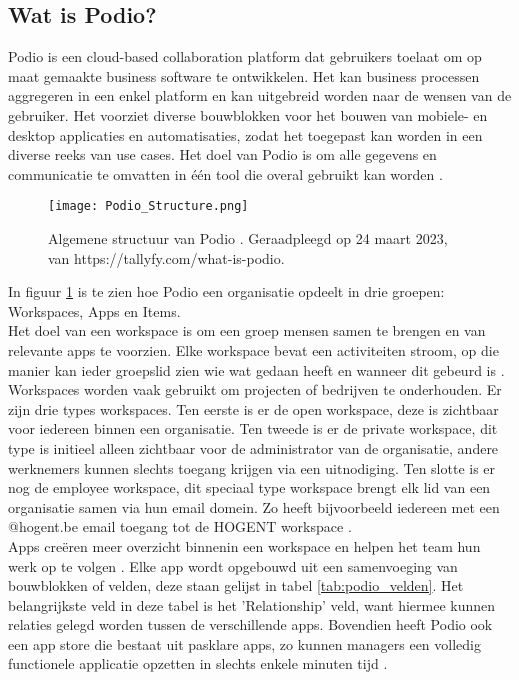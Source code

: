 \subsection{Wat is Podio?}
\label{subsec:wat_is_podio}

Podio is een cloud-based collaboration platform dat gebruikers toelaat om op maat gemaakte business software te ontwikkelen. Het kan business processen aggregeren in een enkel platform en kan uitgebreid worden naar de wensen van de gebruiker. Het voorziet diverse bouwblokken voor het bouwen van mobiele- en desktop applicaties en automatisaties, zodat het toegepast kan worden in een diverse reeks van use cases. Het doel van Podio is om alle gegevens en communicatie te omvatten in één tool die overal gebruikt kan worden \autocite{Podio}. \\ 

\begin{figure}[ht]
    \centering
    \texttt{[image: Podio\_Structure.png]}
    \caption{Algemene structuur van Podio \autocite{TallyfyPodio}. Geraadpleegd op 24 maart 2023, van https://tallyfy.com/what-is-podio.}
    \label{fig:podio_structure}
\end{figure}

In figuur \ref{fig:podio_structure} is te zien hoe Podio een organisatie opdeelt in drie groepen: Workspaces, Apps en Items. \\

Het doel van een workspace is om een groep mensen samen te brengen en van relevante apps te voorzien. Elke workspace bevat een activiteiten stroom, op die manier kan ieder groepslid zien wie wat gedaan heeft en wanneer dit gebeurd is \autocite{TallyfyPodio}. Workspaces worden vaak gebruikt om projecten of bedrijven te onderhouden. Er zijn drie types workspaces. Ten eerste is er de open workspace, deze is zichtbaar voor iedereen binnen een organisatie. Ten tweede is er de private workspace, dit type is initieel alleen zichtbaar voor de administrator van de organisatie, andere werknemers kunnen slechts toegang krijgen via een uitnodiging. Ten slotte is er nog de employee workspace, dit speciaal type workspace brengt elk lid van een organisatie samen via hun email domein. Zo heeft bijvoorbeeld iedereen met een @hogent.be email toegang tot de HOGENT workspace \autocite{PodioFeatures}. \\

Apps creëren meer overzicht binnenin een workspace en helpen het team hun werk op te volgen \autocite{PodioFeatures}. Elke app wordt opgebouwd uit een samenvoeging van bouwblokken of velden, deze staan gelijst in tabel \ref{tab:podio_velden}. Het belangrijkste veld in deze tabel is het 'Relationship' veld, want hiermee kunnen relaties gelegd worden tussen de verschillende apps. Bovendien heeft Podio ook een app store die bestaat uit pasklare apps, zo kunnen managers een volledig functionele applicatie opzetten in slechts enkele minuten tijd \autocite{TallyfyPodio}. \\

